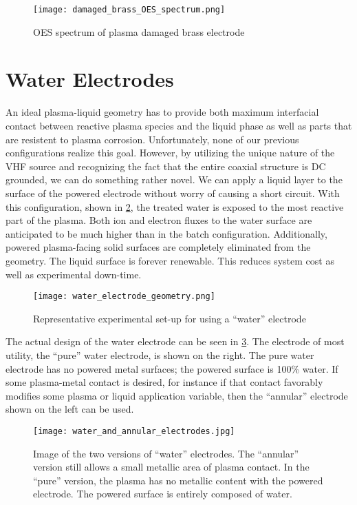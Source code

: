 \begin{figure}[htbp]
  \centering
  \texttt{[image: damaged\_brass\_OES\_spectrum.png]}
  \caption{OES spectrum of plasma damaged brass electrode}
  \label{fig:OES_brass_damage}
\end{figure}

\section{Water Electrodes}
\label{sec:water_electrodes}

An ideal plasma-liquid geometry has to provide both maximum interfacial contact between reactive plasma species and the liquid phase as well as parts that are resistent to plasma corrosion. Unfortunately, none of our previous configurations realize this goal. However, by utilizing the unique nature of the VHF source and recognizing the fact that the entire coaxial structure is DC grounded, we can do something rather novel. We can apply a liquid layer to the surface of the powered electrode without worry of causing a short circuit. With this configuration, shown in \cref{fig:water_electrode_scheme}, the treated water is exposed to the most reactive part of the plasma. Both ion and electron fluxes to the water surface are anticipated to be much higher than in the batch configuration. Additionally, powered plasma-facing solid surfaces are completely eliminated from the geometry. The liquid surface is forever renewable. This reduces system cost as well as experimental down-time.

\begin{figure}[htbp]
  \centering
  \texttt{[image: water\_electrode\_geometry.png]}
  \caption{Representative experimental set-up for using a ``water'' electrode}
  \label{fig:water_electrode_scheme}
\end{figure}

The actual design of the water electrode can be seen in \cref{fig:water_electrodes_image}. The electrode of most utility, the ``pure'' water electrode, is shown on the right. The pure water electrode has no powered metal surfaces; the powered surface is 100\% water. If some plasma-metal contact is desired, for instance if that contact favorably modifies some plasma or liquid application variable, then the ``annular'' electrode shown on the left can be used.

\begin{figure}[htbp]
  \centering
  \texttt{[image: water\_and\_annular\_electrodes.jpg]}
  \caption{Image of the two versions of ``water'' electrodes. The ``annular'' version still allows a small metallic area of plasma contact. In the ``pure'' version, the plasma has no metallic content with the powered electrode. The powered surface is entirely composed of water.}
  \label{fig:water_electrodes_image}
\end{figure}

